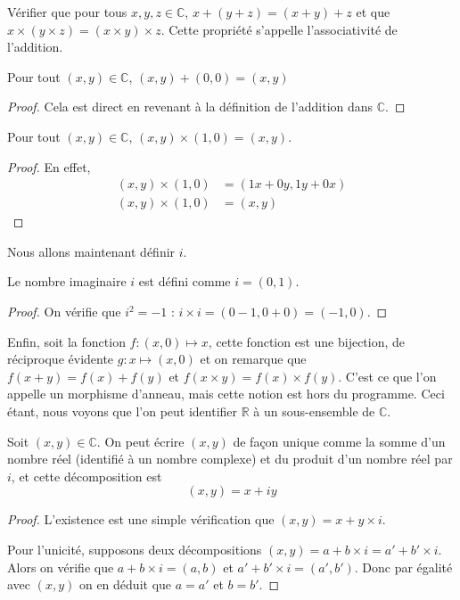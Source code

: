 \begin{exo}
    Vérifier que pour tous $x,y,z\in\mathbb C$, $x+(y+z)=(x+y)+z$ et que $x\times (y\times z)=(x\times y)\times z$. Cette propriété s'appelle l'associativité de l'addition.
\end{exo}

\begin{prop}
    Pour tout $(x,y)\in\mathbb C$, $(x,y)+(0,0)=(x,y)$
\end{prop}
\begin{proof}
    Cela est direct en revenant à la définition de l'addition dans $\mathbb C$.
\end{proof}

\begin{prop}
    Pour tout $(x,y)\in\mathbb C$, $(x,y)\times (1,0)=(x,y)$.
\end{prop}
\begin{proof}
    En effet, \begin{align*}
        (x,y)\times (1,0) &= (1x+0y,1y+0x)\\
        (x,y)\times (1,0) &= (x,y)
    \end{align*}
\end{proof}

Nous allons maintenant définir $i$.

\begin{defi}
    Le nombre imaginaire $i$ est défini comme $i=(0,1)$.
\end{defi}
\begin{proof}
    On vérifie que $i^2=-1$ : $i\times i = (0-1,0+0)=(-1,0)$.
\end{proof}

Enfin, soit la fonction $f : (x,0) \mapsto x$, cette fonction est une bijection, de réciproque évidente $g : x\mapsto (x,0)$ et on remarque que $f(x+y)=f(x)+f(y)$ et $f(x\times y)=f(x)\times f(y)$. C'est ce que l'on appelle un morphisme d'anneau, mais cette notion est hors du programme. Ceci étant, nous voyons que l'on peut identifier $\mathbb R$ à un sous-ensemble de $\mathbb C$.

\begin{them}
    Soit $(x,y)\in\mathbb C$. On peut écrire $(x,y)$ de façon unique comme la somme d'un nombre réel (identifié à un nombre complexe) et du produit d'un nombre réel par $i$, et cette décomposition est $$(x,y)=x+iy$$
\end{them}
\begin{proof}
    L'existence est une simple vérification que $(x,y)=x+y\times i$. 
    
    Pour l'unicité, supposons deux décompositions $(x,y)=a+b\times i = a'+b'\times i$. Alors on vérifie que $a+b\times i=(a,b)$ et $a'+b'\times i=(a',b')$. Donc par égalité avec $(x,y)$ on en déduit que $a=a'$ et $b=b'$.
\end{proof}

